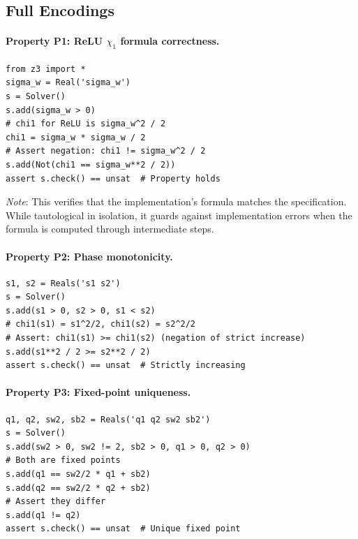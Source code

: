 \documentclass[10pt]{article}
\begin{document}
\subsection{Full Encodings}

\paragraph{Property P1: ReLU $\chi_1$ formula correctness.}
\begin{verbatim}
from z3 import *
sigma_w = Real('sigma_w')
s = Solver()
s.add(sigma_w > 0)
# chi1 for ReLU is sigma_w^2 / 2
chi1 = sigma_w * sigma_w / 2
# Assert negation: chi1 != sigma_w^2 / 2
s.add(Not(chi1 == sigma_w**2 / 2))
assert s.check() == unsat  # Property holds
\end{verbatim}
\emph{Note}: This verifies that the implementation's formula matches the specification.
While tautological in isolation, it guards against implementation errors when the formula is computed through intermediate steps.

\paragraph{Property P2: Phase monotonicity.}
\begin{verbatim}
s1, s2 = Reals('s1 s2')
s = Solver()
s.add(s1 > 0, s2 > 0, s1 < s2)
# chi1(s1) = s1^2/2, chi1(s2) = s2^2/2
# Assert: chi1(s1) >= chi1(s2) (negation of strict increase)
s.add(s1**2 / 2 >= s2**2 / 2)
assert s.check() == unsat  # Strictly increasing
\end{verbatim}

\paragraph{Property P3: Fixed-point uniqueness.}
\begin{verbatim}
q1, q2, sw2, sb2 = Reals('q1 q2 sw2 sb2')
s = Solver()
s.add(sw2 > 0, sw2 != 2, sb2 > 0, q1 > 0, q2 > 0)
# Both are fixed points
s.add(q1 == sw2/2 * q1 + sb2)
s.add(q2 == sw2/2 * q2 + sb2)
# Assert they differ
s.add(q1 != q2)
assert s.check() == unsat  # Unique fixed point
\end{verbatim}
\end{document}
